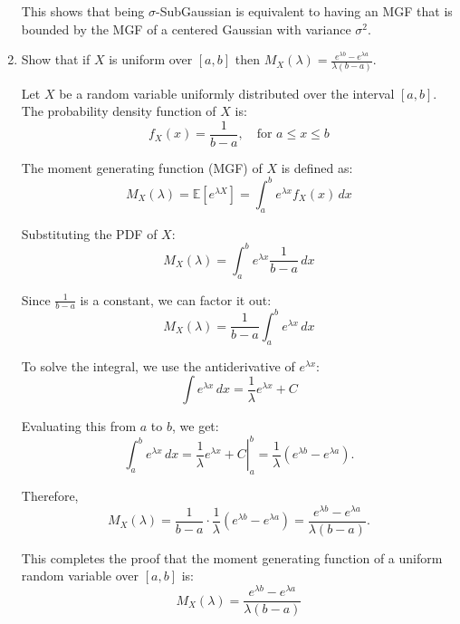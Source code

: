 \documentclass[a4 paper]{article}
\theoremstyle{boldStyle}
\theoremstyle{boldBlueStyle}
\theoremstyle{boldPurpleStyle}
\theoremstyle{boldRedStyle}
\begin{document}
\begin{enumerate}
This shows that being \(\sigma\)-SubGaussian is equivalent to having an MGF that is bounded by the MGF of a centered Gaussian with variance \(\sigma^2\).









    
    
\newpage
\item \textcolor{blueColor}{Show that if \(X\) is uniform over \([a, b]\) then \(M_X(\lambda) = \frac{e^{\lambda b} - e^{\lambda a}}{\lambda (b - a)}\).}

Let \(X\) be a random variable uniformly distributed over the interval \([a, b]\). The probability density function of \(X\) is:
\[
f_X(x) = \frac{1}{b-a}, \quad \text{for } a \leq x \leq b
\]

The moment generating function (MGF) of \(X\) is defined as:
\[
M_X(\lambda) = \mathbb{E}[e^{\lambda X}] = \int_{a}^{b} e^{\lambda x} f_X(x) \, dx
\]

Substituting the PDF of \(X\):
\[
M_X(\lambda) = \int_{a}^{b} e^{\lambda x} \frac{1}{b-a} \, dx
\]

Since \(\frac{1}{b-a}\) is a constant, we can factor it out:
\[
M_X(\lambda) = \frac{1}{b-a} \int_{a}^{b} e^{\lambda x} \, dx
\]

To solve the integral, we use the antiderivative of \(e^{\lambda x}\):
\[
\int e^{\lambda x} \, dx = \frac{1}{\lambda} e^{\lambda x} + C
\]

Evaluating this from \(a\) to \(b\), we get:
\[
\int_{a}^{b} e^{\lambda x} \, dx = \left. \frac{1}{\lambda} e^{\lambda x} + C \right|_{a}^{b} = \frac{1}{\lambda} \left( e^{\lambda b} - e^{\lambda a} \right).
\]

Therefore,
\[
M_X(\lambda) = \frac{1}{b-a} \cdot \frac{1}{\lambda} \left( e^{\lambda b} - e^{\lambda a} \right) = \frac{e^{\lambda b} - e^{\lambda a}}{\lambda (b - a)}.
\]

This completes the proof that the moment generating function of a uniform random variable over \([a, b]\) is:
\[
M_X(\lambda) = \frac{e^{\lambda b} - e^{\lambda a}}{\lambda (b - a)}
\]




\end{enumerate}
\end{document}
